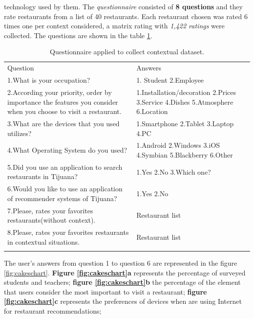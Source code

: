 technology used by them. The \textit{questionnaire} consisted of \textbf{8
questions} and they rate restaurants from a list of 40 restaurants.
Each restaurant chosen was rated 6 times one per context considered, a
matrix rating with \textit{1,422 ratings} were collected. The
questions are shown in the table \ref{tab:questions}.
\begin{table}
\small
\captionsetup{font=footnotesize}
\caption{Questionnaire applied to collect contextual dataset.}
\label{tab:questions} 
\centering
\small
\begin{tabular}{p{7cm} p{5cm} }
\hline\noalign{\smallskip}
Question & Answers \\
\noalign{\smallskip}\hline\noalign{\smallskip}
\small{1.What is your occupation?} & \small{1. Student 2.Employee} \\ \hline  
\small{2.According your priority, order by importance the features 
you consider when you choose to visit a restaurant.} & 
\small{1.Installation/decoration 2.Prices 3.Service 4.Dishes
5.Atmosphere 6.Location} \\ \hline  
\small{3.What are the devices that you used
utilizes?} & \small{1.Smartphone 2.Tablet 3.Laptop 4.PC} \\ \hline   
\small{4.What Operating System do you used?} & 
\small{1.Android 2.Windows 3.iOS 4.Symbian 5.Blackberry 6.Other}
\\ \hline  
\small{5.Did you use an application to search restaurants in Tijuana?} &
\small{1.Yes 2.No 3.Which one?} \\ \hline   
\small{6.Would you like to use an application of
recommender systems of Tijuana?} & \small{1.Yes 2.No} \\ \hline  
\small{7.Please, rates your favorites restaurants(without context).} & 
\small{Restaurant list} \\ \hline
\small{8.Please, rates your favorites restaurants in contextual situations.} & 
\small{Restaurant list} \\
\noalign{\smallskip}\hline
\end{tabular}
\end{table}
The user's answers from question 1 to question 6 are represented in
the figure \ref{fig:cakeschart}. \textbf{Figure \ref{fig:cakeschart}a}
represents the percentage of surveyed students and teachers;
\textbf{figure \ref{fig:cakeschart}b}  the percentage of the element
that users consider the most important to visit a restaurant;
\textbf{figure \ref{fig:cakeschart}c} represents the preferences of
devices when are using Internet for restaurant recommendations;
